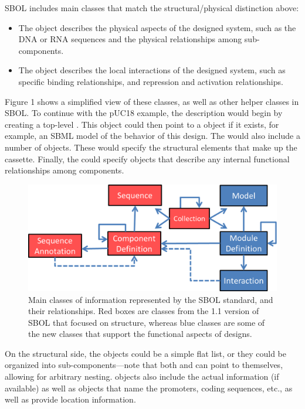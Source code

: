 SBOL includes main classes that match the structural/physical distinction above:
\begin{itemize}
\item The  object describes the physical aspects of the designed system, such as the DNA or RNA sequences and the physical relationships among sub-components.
\item The  object describes the local interactions of the designed system, such as specific binding relationships, and repression and activation relationships. 
\end{itemize}

Figure 1 shows a simplified view of these classes, as well as other helper classes in SBOL. To continue with the pUC18 example, the description would begin by creating a top-level . This object could then point to a  object if it exists, for example, an SBML model of the behavior of this design. The  would also include a number of  objects. These would specify the structural elements that make up the cassette. Finally, the  could specify  objects that describe any internal functional relationships among components. 

\begin{figure}[ht]
\begin{center}
\includegraphics[scale=0.7]{images/OverviewFigforSpec-v6.png}
\caption{Main classes of information represented by the SBOL standard, and their relationships.  Red boxes are classes from the 1.1 version of SBOL that focused on structure, whereas blue classes are some of the new classes that support the functional aspects of designs.}
\label{images:overview1}
\end{center}
\end{figure}

On the structural side, the  objects could be a simple flat list, or they could be organized into sub-components---note that both  and  can point to themselves, allowing for arbitrary nesting.
 objects also include the actual  information (if available) as well as  objects that name the promoters, coding sequences, etc., as well as provide location information. 

